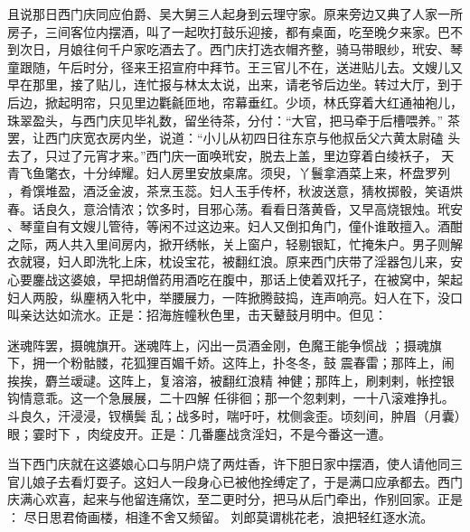 且说那日西门庆同应伯爵、吴大舅三人起身到云理守家。原来旁边又典了人家一所
房子，三间客位内摆酒，叫了一起吹打鼓乐迎接，都有桌面，吃至晚夕来家。巴不
到次日，月娘往何千户家吃酒去了。西门庆打选衣帽齐整，骑马带眼纱，玳安、琴
童跟随，午后时分，径来王招宣府中拜节。王三官儿不在，送进贴儿去。文嫂儿又
早在那里，接了贴儿，连忙报与林太太说，出来，请老爷后边坐。转过大厅，到于
后边，掀起明帘，只见里边氍毹匝地，帘幕垂红。少顷，林氏穿着大红通袖袍儿，
珠翠盈头，与西门庆见毕礼数，留坐待茶，分付：“大官，把马牵于后槽喂养。”
茶罢，让西门庆宽衣房内坐，说道：“小儿从初四日往东京与他叔岳父六黄太尉磕
头去了，只过了元宵才来。”西门庆一面唤玳安，脱去上盖，里边穿着白绫袄子，
天青飞鱼氅衣，十分绰耀。妇人房里安放桌席。须臾，丫鬟拿酒菜上来，杯盘罗列
，肴馔堆盈，酒泛金波，茶烹玉蕊。妇人玉手传杯，秋波送意，猜枚掷骰，笑语烘
春。话良久，意洽情浓；饮多时，目邪心荡。看看日落黄昏，又早高烧银烛。玳安
、琴童自有文嫂儿管待，等闲不过这边来。妇人又倒扣角门，僮仆谁敢擅入。酒酣
之际，两人共入里间房内，掀开绣帐，关上窗户，轻剔银缸，忙掩朱户。男子则解
衣就寝，妇人即洗牝上床，枕设宝花，被翻红浪。原来西门庆带了淫器包儿来，安
心要鏖战这婆娘，早把胡僧药用酒吃在腹中，那话上使着双托子，在被窝中，架起
妇人两股，纵麈柄入牝中，举腰展力，一阵掀腾鼓捣，连声响亮。妇人在下，没口
叫亲达达如流水。正是：招海旌幢秋色里，击天鼙鼓月明中。但见：

迷魂阵罢，摄魄旗开。迷魂阵上，闪出一员酒金刚，色魔王能争惯战
；摄魂旗下，拥一个粉骷髅，花狐狸百媚千娇。这阵上，扑冬冬，鼓
震春雷；那阵上，闹挨挨，麝兰叆叇。这阵上，复溶溶，被翻红浪精
神健；那阵上，刷剌剌，帐控银钩情意乖。这一个急展展，二十四解
任徘徊；那一个忽剌剌，一十八滚难挣扎。斗良久，汗浸浸，钗横鬓
乱；战多时，喘吁吁，枕侧衾歪。顷刻间，肿眉（月囊）眼；霎时下
，肉绽皮开。正是：几番鏖战贪淫妇，不是今番这一遭。

当下西门庆就在这婆娘心口与阴户烧了两炷香，许下胆日家中摆酒，使人请他同三
官儿娘子去看灯耍子。这妇人一段身心已被他拴缚定了，于是满口应承都去。西门
庆满心欢喜，起来与他留连痛饮，至二更时分，把马从后门牵出，作别回家。正是
：
尽日思君倚画楼，相逢不舍又频留。
刘郎莫谓桃花老，浪把轻红逐水流。

